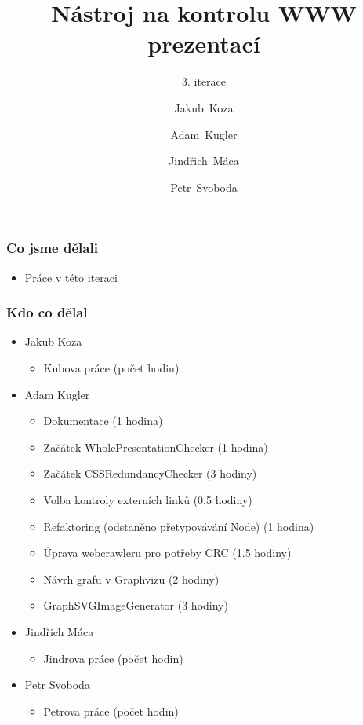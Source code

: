 \documentclass{beamer}
\begin{document}
\title [NKWP]{Nástroj na kontrolu WWW prezentací}
\author[J.~ Koza, A.~ Kugler, J.~Máca, P.~Svoboda]{Jakub~Koza \and Adam~Kugler \and Jindřich~Máca \and Petr~Svoboda}

\subtitle{3. iterace}
\frame{\titlepage}
\begin{frame}[allowframebreaks]\frametitle{Co jsme dělali}
   \begin{itemize}
    \item Práce v této iteraci
   \end{itemize}
\end{frame}

\begin{frame}[allowframebreaks]\frametitle{Kdo co dělal} 
  \begin{itemize}
    \item Jakub Koza
      \begin{itemize}
       \item Kubova práce (počet hodin)
     \end{itemize}

    \item Adam Kugler
      \begin{itemize}
       \item Dokumentace (1 hodina)
       \item Začátek WholePresentationChecker (1 hodina)
       \item Začátek CSSRedundancyChecker (3 hodiny)
       \item Volba kontroly externích linků (0.5 hodiny)
       \item Refaktoring (odstaněno přetypovávání Node) (1 hodina)
       \item Úprava webcrawleru pro potřeby CRC (1.5 hodiny)
       \item Návrh grafu v Graphvizu (2 hodiny)
       \item GraphSVGImageGenerator (3 hodiny)
     \end{itemize}

    \item Jindřich Máca
      \begin{itemize}
       \item Jindrova práce (počet hodin)
     \end{itemize}

    \item Petr Svoboda
      \begin{itemize}
       \item Petrova práce (počet hodin)
     \end{itemize}
   \end{itemize}  
\end{frame} 
\end{document}
